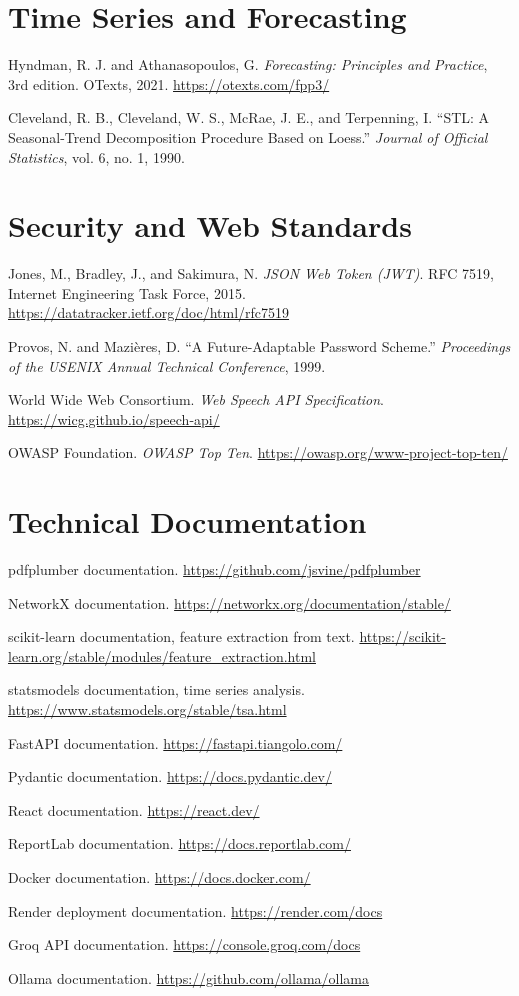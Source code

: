 \section*{Time Series and Forecasting}

\noindent [9] Hyndman, R. J. and Athanasopoulos, G. \textit{Forecasting: Principles and Practice}, 3rd edition. OTexts, 2021. \url{https://otexts.com/fpp3/}

\noindent [10] Cleveland, R. B., Cleveland, W. S., McRae, J. E., and Terpenning, I. ``STL: A Seasonal-Trend Decomposition Procedure Based on Loess.'' \textit{Journal of Official Statistics}, vol. 6, no. 1, 1990.

\section*{Security and Web Standards}

\noindent [11] Jones, M., Bradley, J., and Sakimura, N. \textit{JSON Web Token (JWT)}. RFC 7519, Internet Engineering Task Force, 2015. \url{https://datatracker.ietf.org/doc/html/rfc7519}

\noindent [12] Provos, N. and Mazi\`eres, D. ``A Future-Adaptable Password Scheme.'' \textit{Proceedings of the USENIX Annual Technical Conference}, 1999.

\noindent [13] World Wide Web Consortium. \textit{Web Speech API Specification}. \url{https://wicg.github.io/speech-api/}

\noindent [14] OWASP Foundation. \textit{OWASP Top Ten}. \url{https://owasp.org/www-project-top-ten/}

\section*{Technical Documentation}

\noindent [15] pdfplumber documentation. \url{https://github.com/jsvine/pdfplumber}

\noindent [16] NetworkX documentation. \url{https://networkx.org/documentation/stable/}

\noindent [17] scikit-learn documentation, feature extraction from text. \url{https://scikit-learn.org/stable/modules/feature_extraction.html}

\noindent [18] statsmodels documentation, time series analysis. \url{https://www.statsmodels.org/stable/tsa.html}

\noindent [19] FastAPI documentation. \url{https://fastapi.tiangolo.com/}

\noindent [20] Pydantic documentation. \url{https://docs.pydantic.dev/}

\noindent [21] React documentation. \url{https://react.dev/}

\noindent [22] ReportLab documentation. \url{https://docs.reportlab.com/}

\noindent [23] Docker documentation. \url{https://docs.docker.com/}

\noindent [24] Render deployment documentation. \url{https://render.com/docs}

\noindent [25] Groq API documentation. \url{https://console.groq.com/docs}

\noindent [26] Ollama documentation. \url{https://github.com/ollama/ollama}
